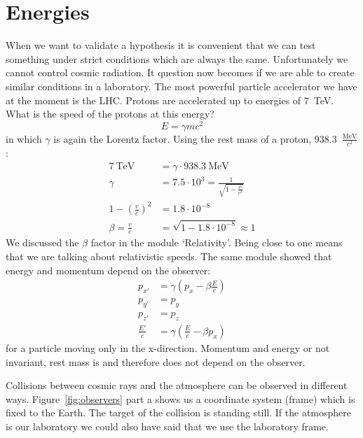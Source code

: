 \section{Energies}
When we want to validate a hypothesis it is convenient that we can test something under strict conditions which are always the same. Unfortunately we cannot control cosmic radiation. It question now becomes if we are able to create similar conditions in a laboratory. The most powerful particle accelerator we have at the moment is the LHC. Protons are accelerated up to energies of 7~TeV. What is the speed of the protons at this energy?
\begin{equation}
E=\gamma m c^2
\end{equation}
in which $\gamma$ is again the Lorentz factor.%
Using the rest mass of a proton, 938.3~$\frac{\mbox{MeV}}{c^2}$:
\begin{align}
7~\mbox{TeV} &= \gamma \cdot 938.3~\mbox{MeV} \\
\gamma &= 7.5 \cdot 10^3 = \frac{1}{\sqrt{1-\frac{v^2}{c^2}}} \\
1 - \left( \frac{v}{c} \right)^2 &= 1.8 \cdot 10^{-8} \\
\beta = \frac{v}{c} &= \sqrt{1 - 1.8 \cdot 10^{-8}} \approx 1
\end{align}
We discussed the $\beta$ factor in the module `Relativity'. Being close to one means that we are talking about relativistic speeds. The same module showed that energy and momentum depend on the observer:
\begin{align}
p_{x'} &= \gamma \left( p_x - \beta \frac{E}{c} \right) \\
p_{y'} &= p_y \\
p_{z'} &= p_z \\
\frac{E'}{c} &= \gamma \left( \frac{E}{c} - \beta p_x \right) 
\end{align}
for a particle moving only in the x-direction. Momentum and energy or not invariant, rest mass is and therefore does not depend on the observer.

Collisions between cosmic rays and the atmosphere can be observed in different ways. Figure~\ref{fig:observers} part a shows us a coordinate system (frame) which is fixed to the Earth. The target of the collision is standing still. If the atmosphere is our laboratory we could also have said that we use the laboratory frame.

